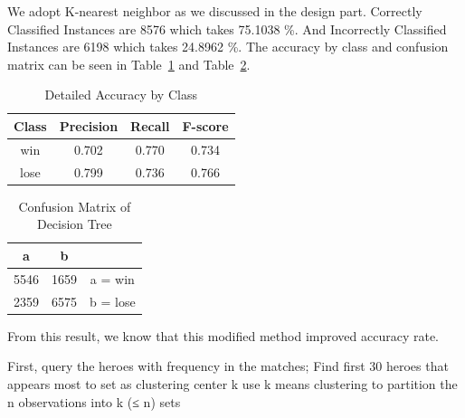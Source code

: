 We adopt K-nearest neighbor as we discussed in the design part. Correctly Classified Instances are 8576 which takes 75.1038 \%. And Incorrectly Classified Instances are 6198 which takes 24.8962 \%. The accuracy by class and confusion matrix can be seen in Table~\ref{table:knnaccuracy} and Table~\ref{table:knnconfusionmatrix}.

\begin{table}
\begin{center}
\begin{tabular}{|c|c|c|c|}
\hline
Class & Precision & Recall & F-score \\ \hline
win & 0.702 & 0.770 & 0.734 \\ \hline
lose & 0.799 & 0.736 & 0.766 \\ \hline
\end{tabular}
\caption{Detailed Accuracy by Class}
\label{table:knnaccuracy}
\end{center}
\end{table}

\begin{table}
\begin{center}
\begin{tabular}{|c|c|c|}
\hline
a & b & \\ \hline
5546 & 1659 & a = win \\ \hline
2359 & 6575 & b = lose \\ \hline
\end{tabular}
\caption{Confusion Matrix of Decision Tree}
\label{table:knnconfusionmatrix}
\end{center}
\end{table}

From this result, we know that this modified method improved accuracy rate.

First, query the heroes with frequency in the matches;
Find first 30 heroes that appears most to set as clustering center k
use k means clustering to partition the n observations into k (≤ n) sets
